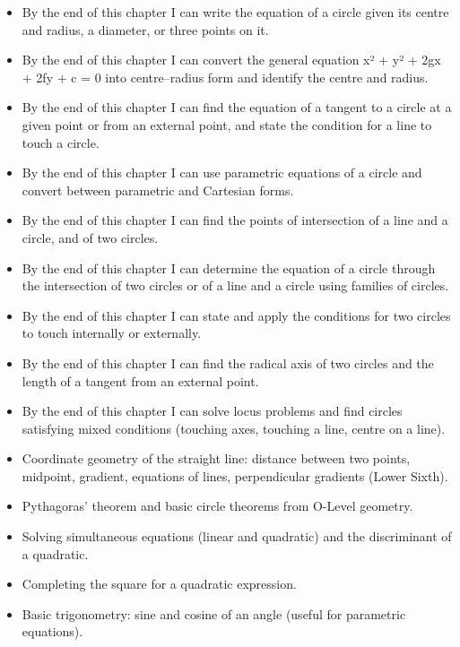 \documentclass[11pt]{article}
\begin{document}
\begin{objectifs}
\begin{itemize}
\item By the end of this chapter I can write the equation of a circle given its centre and radius, a diameter, or three points on it.
\item By the end of this chapter I can convert the general equation x² + y² + 2gx + 2fy + c = 0 into centre–radius form and identify the centre and radius.
\item By the end of this chapter I can find the equation of a tangent to a circle at a given point or from an external point, and state the condition for a line to touch a circle.
\item By the end of this chapter I can use parametric equations of a circle and convert between parametric and Cartesian forms.
\item By the end of this chapter I can find the points of intersection of a line and a circle, and of two circles.
\item By the end of this chapter I can determine the equation of a circle through the intersection of two circles or of a line and a circle using families of circles.
\item By the end of this chapter I can state and apply the conditions for two circles to touch internally or externally.
\item By the end of this chapter I can find the radical axis of two circles and the length of a tangent from an external point.
\item By the end of this chapter I can solve locus problems and find circles satisfying mixed conditions (touching axes, touching a line, centre on a line).
\end{itemize}
\end{objectifs}

\begin{prerequis}
\begin{itemize}
\item Coordinate geometry of the straight line: distance between two points, midpoint, gradient, equations of lines, perpendicular gradients (Lower Sixth).
\item Pythagoras' theorem and basic circle theorems from O-Level geometry.
\item Solving simultaneous equations (linear and quadratic) and the discriminant of a quadratic.
\item Completing the square for a quadratic expression.
\item Basic trigonometry: sine and cosine of an angle (useful for parametric equations).
\end{itemize}
\end{prerequis}
\end{document}
